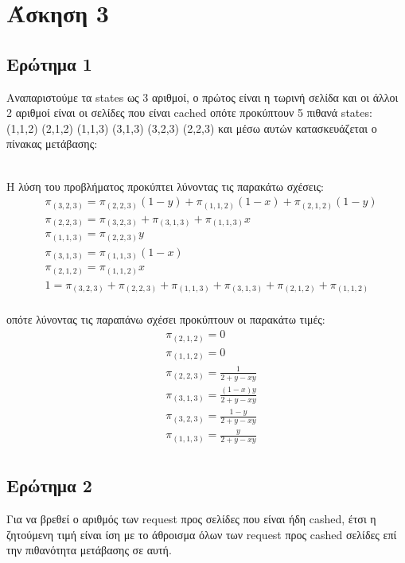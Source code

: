 \section*{Άσκηση 3}
\label{ex3}

\subsection*{Ερώτημα 1}
\label{ex3q1}

Αναπαριστούμε τα states ως 3 αριθμοί, ο πρώτος είναι η τωρινή σελίδα και οι άλλοι 2 αριθμοί είναι οι σελίδες που είναι cached οπότε προκύπτουν 5 πιθανά states: (1,1,2) (2,1,2) (1,1,3) (3,1,3) (3,2,3) (2,2,3) και μέσω αυτών κατασκευάζεται ο πίνακας μετάβασης:


\noindent\\
Η λύση του προβλήματος προκύπτει λύνοντας τις παρακάτω σχέσεις:
\begin{align*}
    &\pi_{(3,2,3)} = \pi_{(2,2,3)}(1 - y) + \pi_{(1,1,2)}(1 - x) + \pi_{(2,1,2)}(1 - y) \\
    &\pi_{(2,2,3)} = \pi_{(3,2,3)} + \pi_{(3,1,3)} + \pi_{(1,1,3)}x \\ 
    &\pi_{(1,1,3)} = \pi_{(2,2,3)}y \\
    &\pi_{(3,1,3)} = \pi_{(1,1,3)}(1 - x)\\
    &\pi_{(2,1,2)} = \pi_{(1,1,2)}x \\
    & 1 = \pi_{(3,2,3)} + \pi_{(2,2,3)} + \pi_{(1,1,3)} + \pi_{(3,1,3)} + \pi_{(2,1,2)} + \pi_{(1,1,2)} \\
\end{align*}
 
οπότε λύνοντας τις παραπάνω σχέσει προκύπτουν οι παρακάτω τιμές:
\begin{align*}
    &\pi_{(2,1,2)} = 0 \\
    &\pi_{(1,1,2)} = 0 \\
    &\pi_{(2,2,3)} = \frac{1}{2 + y - xy}\\ 
    &\pi_{(3,1,3)} = \frac{(1-x)y}{2 + y - xy}\\
    &\pi_{(3,2,3)} = \frac{1-y}{2 + y - xy}\\
    &\pi_{(1,1,3)} = \frac{y}{2 + y - xy}\\
\end{align*}
 

\subsection*{Ερώτημα 2}
\label{ex3q2}


Για να βρεθεί ο αριθμός των request προς σελίδες που είναι ήδη cashed, έτσι η ζητούμενη τιμή είναι ίση με το άθροισμα όλων των request προς cashed σελίδες επί την πιθανότητα μετάβασης σε αυτή.